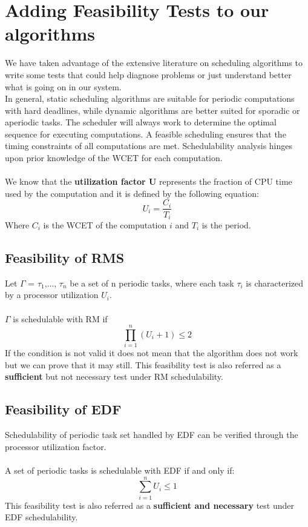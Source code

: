 \documentclass[10pt]{article}
\begin{document}
\section{Adding Feasibility Tests to our algorithms}
We have taken advantage of the extensive literature on scheduling algorithms to write some tests that could help diagnose problems or just understand better what is going on in our system.\\
In general, static scheduling algorithms are suitable for periodic computations with hard deadlines, while dynamic algorithms are better suited for sporadic or aperiodic tasks. The scheduler will always work to determine the optimal sequence for executing computations. A feasible scheduling ensures that the timing constraints of all computations are met. Schedulability analysis hinges upon prior knowledge of the WCET for each computation. \\\\
We know that the \textbf{utilization factor U} represents the fraction of CPU time used by the computation and it is defined by the following equation:
\begin{equation*}
    U_i = \frac{C_i}{T_i}
\end{equation*}
Where $C_i$ is the WCET of the computation $i$ and $T_i$ is the period.
\subsection{Feasibility of RMS}
Let $\Gamma$ = {$\tau_1$,..., $\tau_n$} be a set of n periodic tasks, where each task $\tau_i$ is characterized by a processor utilization $U_i$.\\\\
$\Gamma$ is schedulable with RM if 
\begin{equation*}
    \prod_{i=1}^n (U_i +1) \leq 2
\end{equation*}
If the condition is not valid it does not mean that the algorithm does not work but we can prove that it may still. This feasibility test is also referred as a \textbf{sufficient} but not necessary test under RM schedulability. 

\subsection{Feasibility of EDF}
Schedulability of periodic task set handled by EDF can be verified through the processor utilization factor.\\\\
A set of periodic tasks is schedulable with EDF if and only if:
\begin{equation*}
    \sum_{i=1}^n U_i \leq 1
\end{equation*}
This feasibility test is also referred as a \textbf{sufficient and necessary} test under EDF schedulability.
\end{document}
